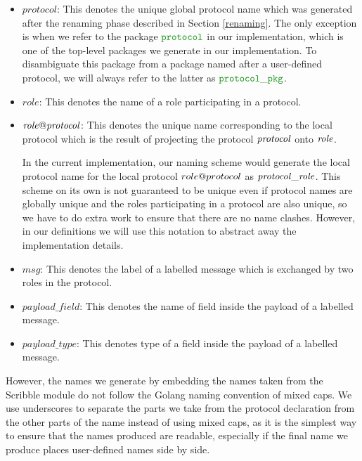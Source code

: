 \documentclass[12pt,twoside]{report}
\begin{document}
\begin{itemize}
    \item $\mathit{protocol}$: This denotes the unique global protocol name which was generated after the renaming phase described in Section \ref{renaming}. The only exception is when we refer to the package $\pkgname{protocol}$ in our implementation, which is one of the top-level packages we generate in our implementation. To disambiguate this package from a package named after a user-defined protocol, we will always refer to the latter as $\pkgname{protocol\_pkg}$.

    \item $\mathit{role}$: This denotes the name of a role participating in a protocol.

    \item $\mathit{\localprotocol{role}{protocol}}$: This denotes the unique name corresponding to the local protocol which is the result of projecting the protocol $\protocolname{protocol}$ onto $\rolename{role}$.
    
    In the current implementation, our naming scheme would generate the local protocol name for the local protocol $\localprotocol{role}{protocol}$ as $\localprotocolname{role}{protocol}$. This scheme on its own is not guaranteed to be unique even if protocol names are globally unique and the roles participating in a protocol are also unique, so we have to do extra work to ensure that there are no name clashes. However, in our definitions we will use this notation to abstract away the implementation details.

    \item $\mathit{msg}$: This denotes the label of a labelled message which is exchanged by two roles in the protocol.
    
    \item $\mathit{payload\_field}$: This denotes the name of field inside the payload of a labelled message.
    
    \item $\mathit{payload\_type}$: This denotes type of a field inside the payload of a labelled message.
\end{itemize}

However, the names we generate by embedding the names taken from the Scribble module do not follow the Golang naming convention of mixed caps. We use underscores to separate the parts we take from the protocol declaration from the other parts of the name instead of using mixed caps, as it is the simplest way to ensure that the names produced are readable, especially if the final name we produce places user-defined names side by side.
\end{document}
